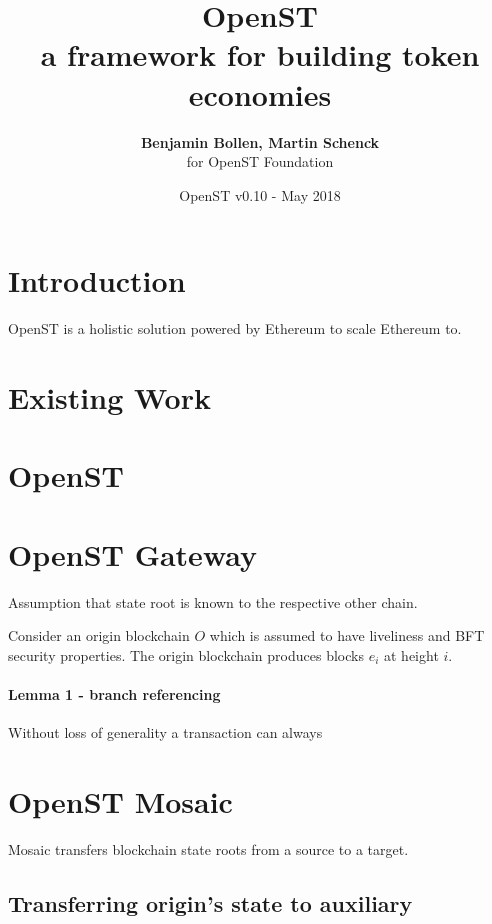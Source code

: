 \documentclass[12pt,a4paper,draft]{article}
\title{\sc OpenST\\ \Large{a framework for building token economies}}
\author{\textbf{Benjamin Bollen, Martin Schenck}\\ for OpenST Foundation}
\date{OpenST v0.10 - May 2018}
\begin{document}
\maketitle


\section{Introduction}

OpenST is a holistic solution powered by Ethereum to scale Ethereum to.

\section{Existing Work}

\section{OpenST}

\section{OpenST Gateway}

Assumption that state root is known to the respective other chain.

Consider an origin blockchain $O$ which is assumed to have liveliness and BFT security properties.  The origin blockchain produces blocks $e_i$ at height $i$.

\paragraph{Lemma 1 - branch referencing} Without loss of generality a transaction can always 

\section{OpenST Mosaic}

Mosaic transfers blockchain state roots from a source to a target.

\subsection{Transferring origin's state to auxiliary}
\end{document}
